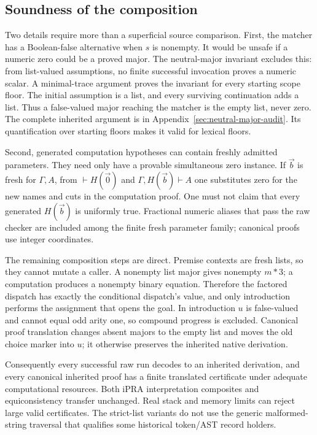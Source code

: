 \documentclass[11pt,letterpaper]{article}
\theoremstyle{definition}\newtheorem{definition}[theorem]{Definition}
\theoremstyle{remark}\newtheorem{remark}[theorem]{Remark}
\begin{document}
\subsection{Soundness of the composition}

Two details require more than a superficial source comparison. First,
the matcher has a Boolean-false alternative when $s$ is nonempty.
It would be unsafe if a numeric zero could be a proved major. The
neutral-major invariant excludes this: from list-valued assumptions,
no finite successful invocation proves a numeric scalar. A minimal-trace
argument proves the invariant for every starting scope floor. The initial
assumption is a list, and every surviving continuation adds a list. Thus
a false-valued major reaching the matcher is the empty list, never zero.
The complete inherited argument is in Appendix~\ref{sec:neutral-major-audit}.
Its quantification over starting floors makes it valid for lexical floors.

Second, generated computation hypotheses can contain freshly admitted
parameters. They need only have a provable simultaneous zero instance.
If $\vec b$ is fresh for $\Gamma,A$, from
$\vdash H(\vec0)$ and $\Gamma,H(\vec b)\vdash A$ one substitutes zero
for the new names and cuts in the computation proof. One must not claim
that every generated $H(\vec b)$ is uniformly true. Fractional numeric
aliases that pass the raw checker are included among the finite fresh
parameter family; canonical proofs use integer coordinates.

The remaining composition steps are direct. Premise contexts are fresh
lists, so they cannot mutate a caller. A nonempty list major gives
nonempty $m*3$; a computation produces a nonempty binary equation.
Therefore the factored dispatch has exactly the conditional dispatch's
value, and only introduction performs the assignment that opens the goal.
In introduction $u$ is false-valued and cannot equal odd arity one, so
compound progress is excluded. Canonical proof translation changes absent
majors to the empty list and moves the old choice marker into $u$; it
otherwise preserves the inherited native derivation.

Consequently every successful raw run decodes to an inherited derivation,
and every canonical inherited proof has a finite translated certificate
under adequate computational resources. Both iPRA interpretation
composites and equiconsistency transfer unchanged. Real stack and memory
limits can reject large valid certificates. The strict-list variants do
not use the generic malformed-string traversal that qualifies some
historical token/AST record holders.
\end{document}
